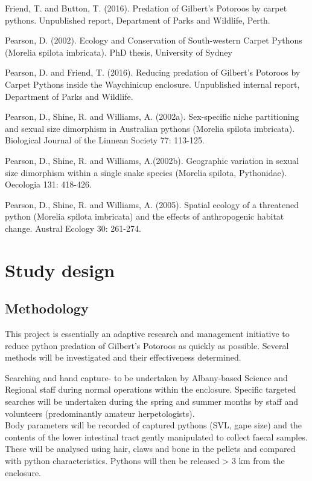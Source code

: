 \documentclass[version=last,
    paper=a4,                               %
    10pt,                                   %
    dvipsnames,
    oneside,                              %
    headings=openany,                       %
    open=any,
    BCOR=7mm,                               %
    DIV=15,     %
]{scrbook}
\begin{document}
Friend, T. and Button, T. (2016). Predation of Gilbert's Potoroos by
carpet pythons. Unpublished report, Department of Parks and Wildlife,
Perth.

Pearson, D. (2002). Ecology and Conservation of South-western Carpet
Pythons (Morelia spilota imbricata). PhD thesis, University of Sydney

Pearson, D. and Friend, T. (2016). Reducing predation of Gilbert's
Potoroos by Carpet Pythons inside the Waychinicup enclosure. Unpublished
internal report, Department of Parks and Wildlife.

Pearson, D., Shine, R. and Williams, A. (2002a). Sex-specific niche
partitioning and sexual size dimorphism in Australian pythons (Morelia
spilota imbricata). Biological Journal of the Linnean Society 77:
113-125.

Pearson, D., Shine, R. and Williams, A.(2002b). Geographic variation in
sexual size dimorphism within a single snake species (Morelia spilota,
Pythonidae). Oecologia 131: 418-426.

Pearson, D., Shine, R. and Williams, A. (2005). Spatial ecology of a
threatened python (Morelia spilota imbricata) and the effects of
anthropogenic habitat change. Austral Ecology 30: 261-274.



\section*{Study design}


\subsection*{Methodology}

This project is essentially an adaptive research and management
initiative to reduce python predation of Gilbert's Potoroos as quickly
as possible. Several methods will be investigated and their
effectiveness determined.

Searching and hand capture- to be undertaken by Albany-based Science and
Regional staff during normal operations within the enclosure. Specific
targeted searches will be undertaken during the spring and summer months
by staff and volunteers (predominantly amateur herpetologists).\\
Body parameters will be recorded of captured pythons (SVL, gape size)
and the contents of the lower intestinal tract gently manipulated to
collect faecal samples. These will be analysed using hair, claws and
bone in the pellets and compared with python characteristics. Pythons
will then be released \textgreater{} 3 km from the enclosure.
\end{document}
